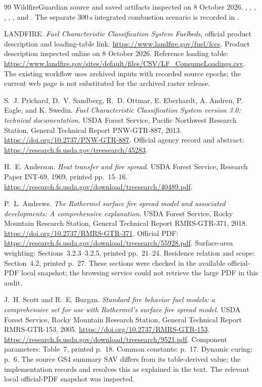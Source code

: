 \documentclass[11pt,a4paper]{article}
\begin{document}
\begin{thebibliography}{99}
WildfireGuardian source and saved artifacts inspected on 8 October 2026.
,
,
,
,
,
, and
.
The separate $300\,\mathrm s$ integrated combustion scenario is recorded in
.

LANDFIRE.
\emph{Fuel Characteristic Classification System Fuelbeds}, official product
description and loading-table link.
\url{https://www.landfire.gov/fuel/fccs}.
Product description inspected online on 8 October 2026.
Reference loading table:
\url{https://www.landfire.gov/sites/default/files/CSV/LF_ConsumeLoadings.csv}.
The existing workflow uses archived inputs with recorded source epochs;
the current web page is not substituted for the archived raster release.

S.~J. Prichard, D.~V. Sandberg, R.~D. Ottmar, E. Eberhardt, A. Andreu,
P. Eagle, and K. Swedin.
\emph{Fuel Characteristic Classification System version 3.0: technical
documentation}. USDA Forest Service, Pacific Northwest Research Station,
General Technical Report PNW-GTR-887, 2013.
\url{https://doi.org/10.2737/PNW-GTR-887}.
Official agency record and abstract:
\url{https://research.fs.usda.gov/treesearch/45283}.

H.~E. Anderson.
\emph{Heat transfer and fire spread}. USDA Forest Service,
Research Paper INT-69, 1969, printed pp.~15--16.
\url{https://research.fs.usda.gov/download/treesearch/40489.pdf}.

P.~L. Andrews.
\emph{The Rothermel surface fire spread model and associated developments:
A comprehensive explanation}. USDA Forest Service, Rocky Mountain Research
Station, General Technical Report RMRS-GTR-371, 2018.
\url{https://doi.org/10.2737/RMRS-GTR-371}.
Official PDF:
\url{https://research.fs.usda.gov/download/treesearch/55928.pdf}.
Surface-area weighting: Sections~3.2.3--3.2.5, printed pp.~21--24.
Residence relation and scope: Section~4.2, printed p.~27.
These sections were checked in the available official-PDF local snapshot;
the browsing service could not retrieve the large PDF in this audit.

J.~H. Scott and R.~E. Burgan.
\emph{Standard fire behavior fuel models: a comprehensive set for use with
Rothermel's surface fire spread model}. USDA Forest Service, Rocky Mountain
Research Station, General Technical Report RMRS-GTR-153, 2005.
\url{https://doi.org/10.2737/RMRS-GTR-153}.
\url{https://research.fs.usda.gov/download/treesearch/9521.pdf}.
Component parameters: Table~7, printed p.~18. Common constants: p.~17.
Dynamic curing: p.~6. The source GS4 summary SAV differs from its table-derived
value; the implementation records and resolves this as explained in the text.
The relevant local official-PDF snapshot was inspected.


\end{thebibliography}
\end{document}
